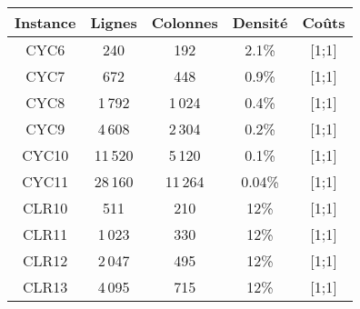 \begin{tabular}{ccccc}
	\toprule
	Instance & Lignes & Colonnes & Densité & Coûts\\
	\midrule
	CYC6 & 240 & 192 & 2.1\% & [1;1]\\
	CYC7 & 672 & 448 & 0.9\% & [1;1]\\
	CYC8 & 1\,792 & 1\,024 & 0.4\% & [1;1]\\
	CYC9 & 4\,608 & 2\,304 & 0.2\% & [1;1]\\
	CYC10 & 11\,520 & 5\,120 & 0.1\% & [1;1]\\
	CYC11 & 28\,160 & 11\,264 & 0.04\% & [1;1]\\
	CLR10 & 511 & 210 & 12\% & [1;1]\\
	CLR11 & 1\,023 & 330 & 12\% & [1;1]\\
	CLR12 & 2\,047 & 495 & 12\% & [1;1]\\
	CLR13 & 4\,095 & 715 & 12\% & [1;1]\\
	\bottomrule
\end{tabular}
